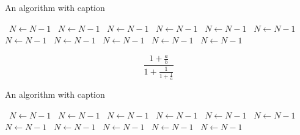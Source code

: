 \documentclass[a4paper]{article}
\begin{document}
\begin{algorithm}
\caption{An algorithm with caption}
\begin{algorithmic}
\    \State $N \gets N - 1$
\    \State $N \gets N - 1$
\    \State $N \gets N - 1$
\    \State $N \gets N - 1$
\    \State $N \gets N - 1$
\    \State $N \gets N - 1$
\    \State $N \gets N - 1$
\    \State $N \gets N - 1$
\    \State $N \gets N - 1$
\    \State $N \gets N - 1$
\    \State $N \gets N - 1$
\EndWhile
\end{algorithmic}
\end{algorithm}

\[ \frac{1+\frac{a}{b}}{1+\frac{1}{1+\frac{1}{a}}} \]

\begin{algorithm}
\caption{An algorithm with caption}
\begin{algorithmic}
\    \State $N \gets N - 1$
\    \State $N \gets N - 1$
\    \State $N \gets N - 1$
\    \State $N \gets N - 1$
\    \State $N \gets N - 1$
\    \State $N \gets N - 1$
\    \State $N \gets N - 1$
\    \State $N \gets N - 1$
\    \State $N \gets N - 1$
\    \State $N \gets N - 1$
\    \State $N \gets N - 1$
\EndWhile
\end{algorithmic}
\end{algorithm}
\end{document}
